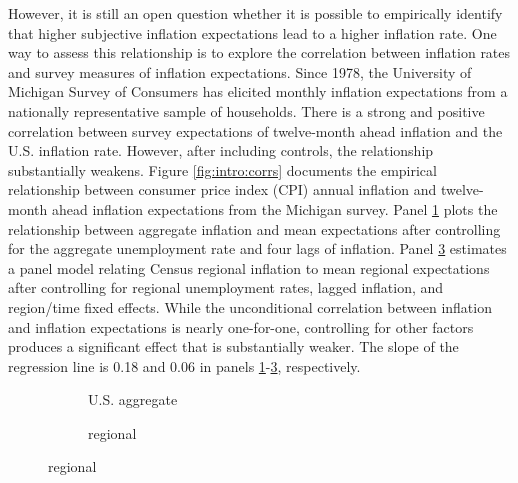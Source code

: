 \documentclass[12pt]{article}
\begin{document}
However, it is still an open question whether it is possible to empirically identify that higher subjective inflation expectations lead to a higher inflation rate. One way to assess this relationship is to explore the correlation between inflation rates and survey measures of inflation expectations. Since 1978, the University of Michigan Survey of Consumers has elicited monthly inflation expectations from a nationally representative sample of households. There is a strong and positive correlation between survey expectations of twelve-month ahead inflation and the U.S. inflation rate. However, after including controls, the relationship substantially weakens. Figure \ref{fig:intro:corrs} documents the empirical relationship between consumer price index (CPI) annual inflation and twelve-month ahead inflation expectations from the Michigan survey.  Panel \ref{subfig:intro:us} plots the relationship between aggregate inflation and mean expectations after controlling for the aggregate unemployment rate and four lags of inflation. Panel \ref{subfig:intro:reg} estimates a panel model relating Census regional inflation to mean regional expectations after controlling for regional unemployment rates, lagged inflation, and region/time fixed effects. While the unconditional correlation between inflation and inflation expectations is nearly one-for-one, controlling for other factors produces a significant effect that is substantially weaker. The slope of the regression line is 0.18 and 0.06 in panels \ref{subfig:intro:us}-\ref{subfig:intro:reg}, respectively.\begin{figure}
\centering
\caption{Inflation and inflation expectations}\label{fig:intro:corrs}
\begin{subfigure}[t]{0.45\textwidth}
\centering

\caption{U.S. aggregate}\label{subfig:intro:us}
\end{subfigure}
\hfill
\begin{subfigure}[t]{0.45\textwidth}
\centering

\caption{regional}\label{subfig:intro:reg}
\end{subfigure}
\end{figure}
\end{document}
